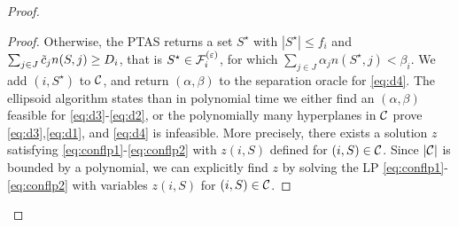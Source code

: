 \begin{proof}
\begin{proof}
Otherwise, the PTAS  returns a set $S^\star$ with $|S^\star|\le f_i$ and $\sum_{j\in J}\tilde{c}_j n(S,j) \geq D_i$, that is $S^\star \in {\cal F}^{(\varepsilon)}_i$, for which 
$\sum_{j\in J}\alpha_j n(S^\star,j) < \beta_i$. We add $(i,S^\star)$ to ${\cal C}$, and return $(\alpha,\beta)$ to the separation oracle for \eqref{eq:d4}.
The ellipsoid algorithm states than in polynomial time we either find an $(\alpha,\beta)$ feasible for \eqref{eq:d3}-\eqref{eq:d2}, or the polynomially many hyperplanes
in ${\cal C}$ prove \eqref{eq:d3},\eqref{eq:d1}, and \eqref{eq:d4} is infeasible.
More precisely, there exists a solution $z$ satisfying \eqref{eq:conflp1}-\eqref{eq:conflp2} with $z(i,S)$ defined for $(i,S)\in {\cal C}$. 
Since $|{\cal C}|$ is bounded by a polynomial, we can explicitly find $z$ by solving the LP \eqref{eq:conflp1}-\eqref{eq:conflp2} with variables $z(i,S)$ for $(i,S)\in {\cal C}$.
\end{proof}\end{proof}


